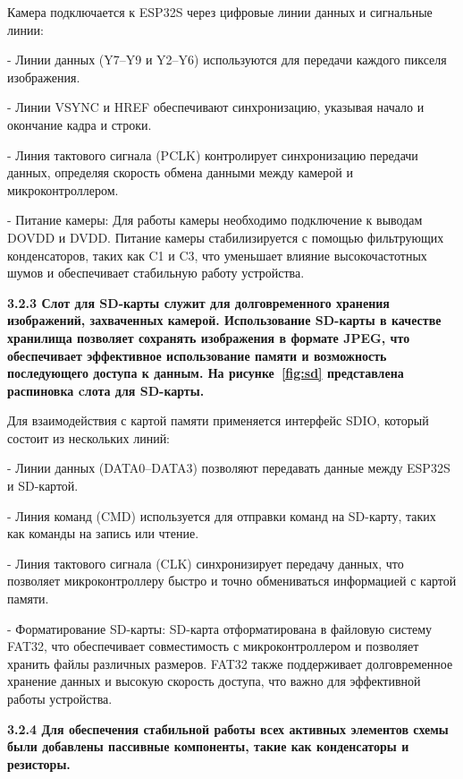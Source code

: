
    Камера подключается к ESP32S 
через цифровые линии данных и сигнальные линии:

    - Линии данных (Y7–Y9 и Y2–Y6) 
используются для передачи каждого пикселя изображения.

    - Линии VSYNC и HREF обеспечивают 
синхронизацию, указывая начало и окончание кадра и строки.

    - Линия тактового сигнала (PCLK) 
контролирует синхронизацию передачи данных, определяя скорость 
обмена данными между камерой и микроконтроллером.

    - Питание камеры: Для работы камеры 
необходимо подключение к выводам DOVDD и DVDD. Питание камеры 
стабилизируется с помощью фильтрующих конденсаторов, таких как 
C1 и C3, что уменьшает влияние высокочастотных шумов и 
обеспечивает стабильную работу устройства.

\bf{3.2.3} \normalfont Слот для SD-карты служит для 
долговременного хранения изображений, захваченных камерой. 
Использование SD-карты в качестве хранилища позволяет сохранять 
изображения в формате JPEG, что обеспечивает эффективное 
использование памяти и возможность последующего доступа к 
данным.
На рисунке~\ref{fig:sd} представлена
распиновка cлота для SD-карты\cite{ESP-Wrover}.


    Для взаимодействия с картой памяти 
применяется интерфейс SDIO, который состоит из нескольких линий:

    - Линии данных (DATA0–DATA3) позволяют 
передавать данные между ESP32S и SD-картой.

    - Линия команд (CMD) используется для 
отправки команд на SD-карту, таких как команды на запись или 
чтение.

    - Линия тактового сигнала (CLK) 
синхронизирует передачу данных, что позволяет микроконтроллеру 
быстро и точно обмениваться информацией с картой памяти.

    - Форматирование SD-карты: SD-карта 
отформатирована в файловую систему FAT32, что обеспечивает 
совместимость с микроконтроллером и позволяет хранить файлы 
различных размеров. FAT32 также поддерживает долговременное 
хранение данных и высокую скорость доступа, что важно для 
эффективной работы устройства.

\bf{3.2.4} \normalfont Для обеспечения стабильной работы всех 
активных элементов схемы были добавлены пассивные компоненты, 
такие как конденсаторы и резисторы.

